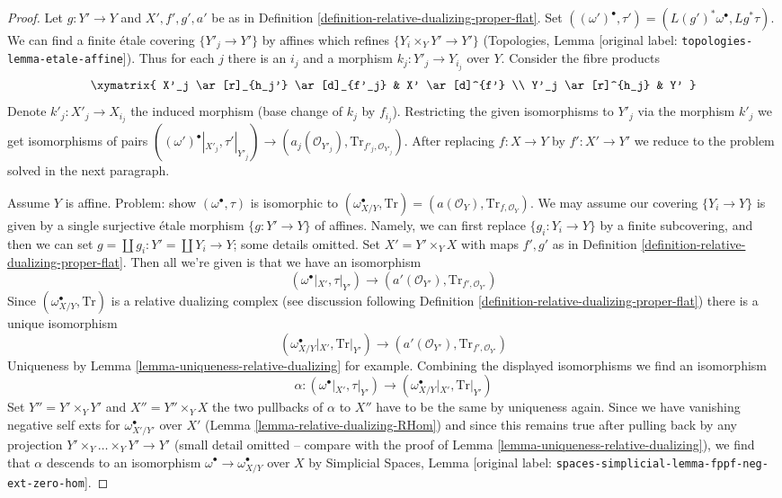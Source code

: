 \documentclass[10pt,a4paper]{article}
\theoremstyle{plain}
\theoremstyle{definition}
\theoremstyle{remark}
\numberwithin{equation}{subsection}
\begin{document}
\begin{proof}
Let $g : Y' \to Y$ and $X', f', g', a'$ be as in
Definition \ref{definition-relative-dualizing-proper-flat}.
Set $((\omega')^\bullet, \tau') = (L(g')^*\omega^\bullet, Lg^*\tau)$.
We can find a finite \'etale covering
$\{Y'_j \to Y'\}$ by affines which refines $\{Y_i \times_Y Y' \to Y'\}$
(Topologies, Lemma \textnormal{[original label: \nolinkurl{topologies-lemma-etale-affine}]}).
Thus for each $j$ there is an $i_j$ and a morphism
$k_j : Y'_j \to Y_{i_j}$ over $Y$. Consider the fibre products
$$
\xymatrix{
X'_j \ar[r]_{h_j'} \ar[d]_{f'_j} &
X' \ar[d]^{f'} \\
Y'_j \ar[r]^{h_j} & Y'
}
$$
Denote $k'_j : X'_j \to X_{i_j}$ the induced morphism (base change
of $k_j$ by $f_{i_j}$). Restricting the given isomorphisms to $Y'_j$
via the morphism $k'_j$ we get isomorphisms of pairs
$((\omega')^\bullet|_{X'_j}, \tau'|_{Y'_j})
\to (a_j(\mathcal{O}_{Y'_j}), \text{Tr}_{f'_j, \mathcal{O}_{Y'_j}})$.
After replacing $f : X \to Y$ by $f' : X' \to Y'$ we reduce to the
problem solved in the next paragraph.

\medskip\noindent
Assume $Y$ is affine. Problem: show $(\omega^\bullet, \tau)$ is
isomorphic to $(\omega_{X/Y}^\bullet, \text{Tr}) =
(a(\mathcal{O}_Y), \text{Tr}_{f, \mathcal{O}_Y})$.
We may assume our covering $\{Y_i \to Y\}$ is given by a single
surjective \'etale morphism $\{g : Y' \to Y\}$ of affines.
Namely, we can first replace $\{g_i: Y_i \to Y\}$ by a finite
subcovering, and then we can set $g = \coprod g_i :  Y' = \coprod Y_i \to Y$;
some details omitted. Set $X' = Y' \times_Y X$ with maps
$f', g'$ as in Definition \ref{definition-relative-dualizing-proper-flat}.
Then all we're given is that we have an isomorphism
$$
(\omega^\bullet|_{X'}, \tau|_{Y'}) \to
(a'(\mathcal{O}_{Y'}), \text{Tr}_{f', \mathcal{O}_{Y'}})
$$
Since $(\omega_{X/Y}^\bullet, \text{Tr})$ is a relative dualizing complex
(see discussion following
Definition \ref{definition-relative-dualizing-proper-flat})
there is a unique isomorphism
$$
(\omega_{X/Y}^\bullet|_{X'}, \text{Tr}|_{Y'}) \to
(a'(\mathcal{O}_{Y'}), \text{Tr}_{f', \mathcal{O}_{Y'}})
$$
Uniqueness by Lemma \ref{lemma-uniqueness-relative-dualizing} for example.
Combining the displayed isomorphisms we find an isomorphism
$$
\alpha :
(\omega^\bullet|_{X'}, \tau|_{Y'}) \to
(\omega_{X/Y}^\bullet|_{X'}, \text{Tr}|_{Y'})
$$
Set $Y'' = Y' \times_Y Y'$ and $X'' = Y'' \times_Y X$ the two
pullbacks of $\alpha$ to $X''$ have to be the same by uniqueness again.
Since we have vanishing negative self exts for
$\omega_{X'/Y'}^\bullet$ over $X'$ (Lemma \ref{lemma-relative-dualizing-RHom})
and since this remains true after pulling back by any projection
$Y' \times_Y \ldots \times_Y Y' \to Y'$ (small detail omitted -- compare
with the proof of Lemma \ref{lemma-uniqueness-relative-dualizing}),
we find that $\alpha$ descends to an isomorphism
$\omega^\bullet \to \omega_{X/Y}^\bullet$
over $X$ by Simplicial Spaces, Lemma
\textnormal{[original label: \nolinkurl{spaces-simplicial-lemma-fppf-neg-ext-zero-hom}]}.
\end{proof}
\end{document}
